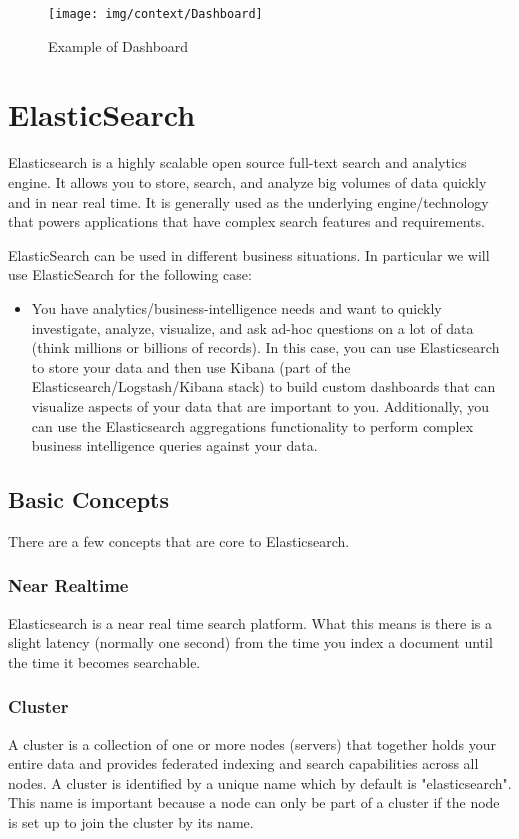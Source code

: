\documentclass[a4paper, 12pt]{book}
\begin{document}
\begin{figure}[H]
  \centering
  \texttt{[image: img/context/Dashboard]}
  \caption{Example of Dashboard}
  \label{fig:dashboardex}
\end{figure}

\section{ElasticSearch}
\label{sec:elasticsearch}
Elasticsearch is a highly scalable open source full-text search and analytics engine. It allows you to store, search, and analyze big volumes of data quickly and in near real time. It is generally used as the underlying engine/technology that powers applications that have complex search features and requirements.

ElasticSearch can be used in different business situations. In particular we will use ElasticSearch for the following case:

\begin{itemize}
\item You have analytics/business-intelligence needs and want to quickly investigate, analyze, visualize, and ask ad-hoc questions on a lot of data (think millions or billions of records). In this case, you can use Elasticsearch to store your data and then use Kibana (part of the Elasticsearch/Logstash/Kibana stack) to build custom dashboards that can visualize aspects of your data that are important to you. Additionally, you can use the Elasticsearch aggregations functionality to perform complex business intelligence queries against your data.
\end{itemize}

\subsection{Basic Concepts}
There are a few concepts that are core to Elasticsearch.

\subsubsection{Near Realtime}
Elasticsearch is a near real time search platform. What this means is there is a slight latency (normally one second) from the time you index a document until the time it becomes searchable.

\subsubsection{Cluster}
A cluster is a collection of one or more nodes (servers) that together holds your entire data and provides federated indexing and search capabilities across all nodes. A cluster is identified by a unique name which by default is "elasticsearch". This name is important because a node can only be part of a cluster if the node is set up to join the cluster by its name.
\end{document}
